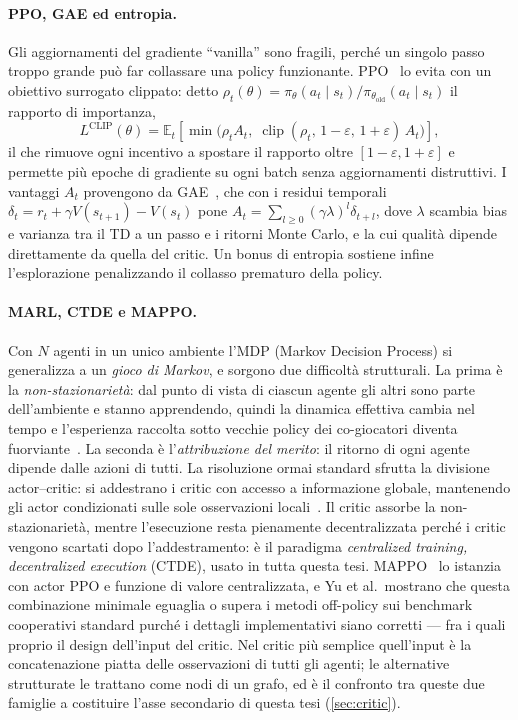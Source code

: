 \paragraph{PPO, GAE ed entropia.}
Gli aggiornamenti del gradiente ``vanilla'' sono fragili, perché un
singolo passo troppo grande può far collassare una policy funzionante.
PPO~\cite{schulman2017ppo} lo evita con un obiettivo surrogato clippato:
detto $\rho_t(\theta) = \pi_{\theta}(a_t\mid s_t)/\pi_{\theta_{\text{old}}}(a_t\mid s_t)$
il rapporto di importanza,
\begin{equation}
  L^{\mathrm{CLIP}}(\theta) =
  \mathbb{E}_t\!\left[\min\bigl(\rho_t A_t,\;
  \operatorname{clip}(\rho_t,\, 1-\varepsilon,\, 1+\varepsilon)\, A_t\bigr)\right],
\end{equation}
il che rimuove ogni incentivo a spostare il rapporto oltre
$[1-\varepsilon, 1+\varepsilon]$ e permette più epoche di gradiente su
ogni batch senza aggiornamenti distruttivi. I vantaggi $A_t$ provengono
da GAE~\cite{schulman2016gae}, che con i residui temporali
$\delta_t = r_t + \gamma V(s_{t+1}) - V(s_t)$ pone
$A_t = \sum_{l \geq 0} (\gamma\lambda)^{l}\delta_{t+l}$, dove $\lambda$
scambia bias e varianza tra il TD a un passo e i ritorni Monte Carlo, e
la cui qualità dipende direttamente da quella del critic. Un bonus di
entropia sostiene infine l'esplorazione penalizzando il collasso
prematuro della policy.

\paragraph{MARL, CTDE e MAPPO.}
Con $N$ agenti in un unico ambiente l'MDP (Markov Decision Process) si 
generalizza a un \emph{gioco di Markov}, e sorgono due difficoltà strutturali. 
La prima è la \emph{non-stazionarietà}: dal punto di vista di ciascun agente gli
altri sono parte dell'ambiente e stanno apprendendo, quindi la dinamica
effettiva cambia nel tempo e l'esperienza raccolta sotto vecchie policy
dei co-giocatori diventa fuorviante~\cite{lowe2017maddpg}. La seconda è
l'\emph{attribuzione del merito}: il ritorno di ogni agente dipende
dalle azioni di tutti. La risoluzione ormai standard sfrutta la
divisione actor--critic: si addestrano i critic con accesso a
informazione globale, mantenendo gli actor condizionati sulle sole
osservazioni locali~\cite{lowe2017maddpg}. Il critic assorbe la
non-stazionarietà, mentre l'esecuzione resta pienamente decentralizzata
perché i critic vengono scartati dopo l'addestramento: è il paradigma
\emph{centralized training, decentralized execution} (CTDE), usato in
tutta questa tesi. MAPPO~\cite{yu2022surprising} lo istanzia con actor
PPO e funzione di valore centralizzata, e Yu et al.\ mostrano che questa
combinazione minimale eguaglia o supera i metodi off-policy sui
benchmark cooperativi standard purché i dettagli implementativi siano
corretti --- fra i quali proprio il design dell'input del critic. Nel
critic più semplice quell'input è la concatenazione piatta delle
osservazioni di tutti gli agenti; le alternative strutturate le trattano
come nodi di un grafo, ed è il confronto tra queste due famiglie a
costituire l'asse secondario di questa tesi (\cref{sec:critic}).


